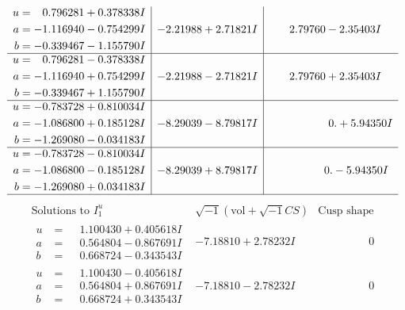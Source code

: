 \documentclass[1p]{elsarticle_modified}
\theoremstyle{definition}
\newcommand{\I}{\sqrt{-1}}
\begin{document}
$$\begin{array}{c|c|c}
\begin{aligned}
u &= \phantom{-}0.796281 + 0.378338 I \\
a &= -1.116940 - 0.754299 I \\
b &= -0.339467 - 1.155790 I\end{aligned}
 & -2.21988 + 2.71821 I & \phantom{-}2.79760 - 2.35403 I \\ \hline\begin{aligned}
u &= \phantom{-}0.796281 - 0.378338 I \\
a &= -1.116940 + 0.754299 I \\
b &= -0.339467 + 1.155790 I\end{aligned}
 & -2.21988 - 2.71821 I & \phantom{-}2.79760 + 2.35403 I \\ \hline\begin{aligned}
u &= -0.783728 + 0.810034 I \\
a &= -1.086800 + 0.185128 I \\
b &= -1.269080 - 0.034183 I\end{aligned}
 & -8.29039 - 8.79817 I & \phantom{-0.000000 -}0. + 5.94350 I \\ \hline\begin{aligned}
u &= -0.783728 - 0.810034 I \\
a &= -1.086800 - 0.185128 I \\
b &= -1.269080 + 0.034183 I\end{aligned}
 & -8.29039 + 8.79817 I & \phantom{-0.000000 } 0. - 5.94350 I\\
 \hline 
 \end{array}$$\newpage$$\begin{array}{c|c|c}  
\text{Solutions to }I^u_{1}& \I (\text{vol} + \sqrt{-1}CS) & \text{Cusp shape}\\
 \hline 
\begin{aligned}
u &= \phantom{-}1.100430 + 0.405618 I \\
a &= \phantom{-}0.564804 - 0.867691 I \\
b &= \phantom{-}0.668724 - 0.343543 I\end{aligned}
 & -7.18810 + 2.78232 I & \phantom{-0.000000 } 0 \\ \hline\begin{aligned}
u &= \phantom{-}1.100430 - 0.405618 I \\
a &= \phantom{-}0.564804 + 0.867691 I \\
b &= \phantom{-}0.668724 + 0.343543 I\end{aligned}
 & -7.18810 - 2.78232 I & \phantom{-0.000000 } 0 \\ \hline\begin{aligned}

\end{aligned}
\end{array}$$
\end{document}
